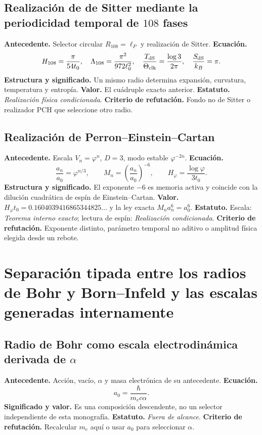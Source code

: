 \subsection*{Realización de de Sitter mediante la periodicidad temporal de \(108\) fases}
\textbf{Antecedente.} Selector circular \(R_{108}=\ell_P\) y realizaci\'on de
Sitter. \textbf{Ecuaci\'on.}
\[
H_{108}=\frac{\pi}{54t_0},\quad
\Lambda_{108}=\frac{\pi^2}{972\ell_0^2},\quad
\frac{T_{\rm dS}}{\Theta_{\rm clk}}=\frac{\log3}{2\pi},\quad
\frac{S_{\rm dS}}{k_B}=\pi.
\]
\textbf{Estructura y significado.} Un mismo radio determina expansi\'on,
curvatura, temperatura y entrop\'ia. \textbf{Valor.} El cu\'adruple exacto
anterior. \textbf{Estatuto.} \emph{Realizaci\'on f\'isica condicionada}.
\textbf{Criterio de refutación.} Fondo no de Sitter o realizador PCH que seleccione otro
radio.

\subsection*{Realizaci\'on de Perron--Einstein--Cartan }
\textbf{Antecedente.} Escala \(V_n=\varphi^n\), \(D=3\), modo estable
\(\varphi^{-2n}\). \textbf{Ecuaci\'on.}
\[
\frac{a_n}{a_0}=\varphi^{n/3},\qquad
M_n=\left(\frac{a_n}{a_0}\right)^{-6},\qquad
H_\varphi=\frac{\log\varphi}{3t_0}.
\]
\textbf{Estructura y significado.} El exponente \(-6\) es memoria activa y
coincide con la diluci\'on cuadr\'atica de esp\'in de Einstein--Cartan.
\textbf{Valor.} \(H_\varphi t_0=0.1604039416865344825\ldots\) y la ley exacta
\(M_na_n^6=a_0^6\). \textbf{Estatuto.} Escala:
\emph{Teorema interno exacto}; lectura de esp\'in: \emph{Realizaci\'on condicionada}.
\textbf{Criterio de refutación.} Exponente distinto, par\'ametro temporal no
aditivo o amplitud f\'isica
elegida desde un rebote.

\section{Separación tipada entre los radios de Bohr y Born--Infeld y las escalas generadas internamente}

\subsection*{Radio de Bohr como escala electrodinámica derivada de \(\alpha\)}
\textbf{Antecedente.} Acci\'on, vac\'io, \(\alpha\) y masa electr\'onica de su
antecedente. \textbf{Ecuaci\'on.}
\begin{equation}
a_0=\frac{\hbar}{m_ec\alpha}.
\label{eq:atlas-bohr}
\end{equation}
\textbf{Significado y valor.} Es una composici\'on
descendente, no un selector independiente de esta monograf\'ia.
\textbf{Estatuto.} \emph{Fuera de alcance}. \textbf{Criterio de refutación.} Recalcular
\(m_e\) aqu\'i o usar \(a_0\) para seleccionar \(\alpha\).

